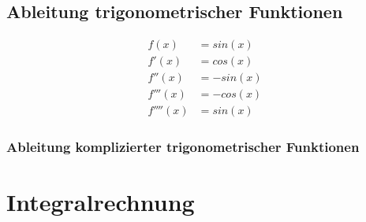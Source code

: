 \documentclass[a4paper]{article} %
\begin{document}
	\subsection{Ableitung trigonometrischer Funktionen}
	\begin{align*}
	f(x) &= sin(x)\\
	f'(x) &= cos(x)\\
	f''(x) &= -sin(x)\\
	f'''(x) &= -cos(x)\\
	f''''(x) &= sin(x)
 	\end{align*}
 	\subsubsection{Ableitung komplizierter trigonometrischer Funktionen}
	\pagebreak
	\section{Integralrechnung}
\end{document}
